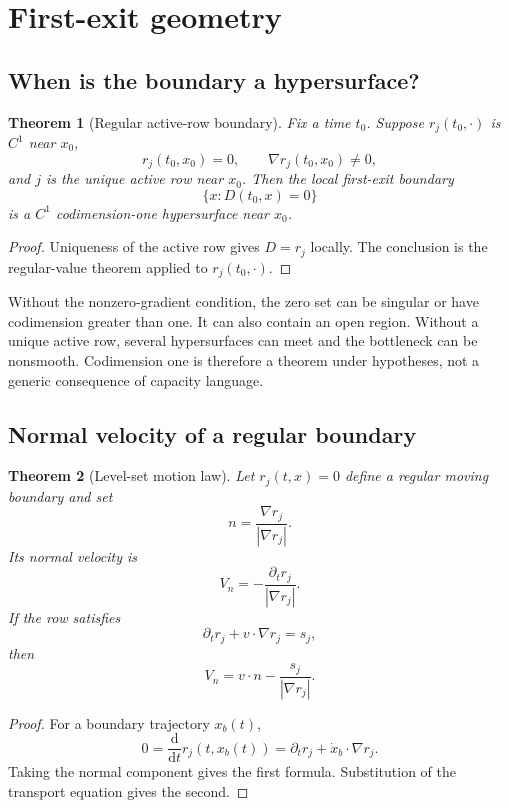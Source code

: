 \documentclass[11pt]{article}
\newtheorem{theorem}{Theorem}[section]
\theoremstyle{definition}
\theoremstyle{remark}
\newcommand{\dd}{\mathrm d}
\begin{document}
\section{First-exit geometry}
\label{sec:boundary}

\subsection{When is the boundary a hypersurface?}

\begin{theorem}[Regular active-row boundary]
\label{thm:regularboundary}
Fix a time \(t_0\).  Suppose \(r_j(t_0,\cdot)\) is \(C^1\) near \(x_0\),
\[
 r_j(t_0,x_0)=0,
\qquad
 \nabla r_j(t_0,x_0)\ne0,
\]
and \(j\) is the unique active row near \(x_0\).  Then the local
first-exit boundary
\[
 \{x:D(t_0,x)=0\}
\]
is a \(C^1\) codimension-one hypersurface near \(x_0\).
\end{theorem}

\begin{proof}
Uniqueness of the active row gives \(D=r_j\) locally.  The conclusion is
the regular-value theorem applied to \(r_j(t_0,\cdot)\).
\end{proof}

Without the nonzero-gradient condition, the zero set can be singular or
have codimension greater than one.  It can also contain an open region.
Without a unique active row, several hypersurfaces can meet and the
bottleneck can be nonsmooth.
Codimension one is therefore a theorem under hypotheses, not a generic
consequence of capacity language.

\subsection{Normal velocity of a regular boundary}

\begin{theorem}[Level-set motion law]
\label{thm:normalvelocity}
Let \(r_j(t,x)=0\) define a regular moving boundary and set
\[
 n=\frac{\nabla r_j}{|\nabla r_j|}.
\]
Its normal velocity is
\[
 V_n=-\frac{\partial_t r_j}{|\nabla r_j|}.
\]
If the row satisfies
\[
 \partial_t r_j+v\cdot\nabla r_j=s_j,
\]
then
\[
 V_n=v\cdot n-\frac{s_j}{|\nabla r_j|}.
\]
\end{theorem}

\begin{proof}
For a boundary trajectory \(x_b(t)\),
\[
 0=\frac{\dd}{\dd t}r_j(t,x_b(t))
 =\partial_t r_j+\dot x_b\cdot\nabla r_j.
\]
Taking the normal component gives the first formula.  Substitution of the
transport equation gives the second.
\end{proof}
\end{document}
